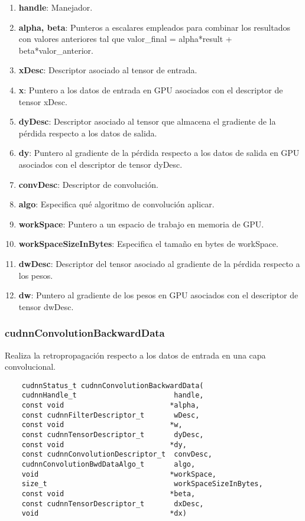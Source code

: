\begin{enumerate}
	\item \textbf{handle}: Manejador.
	\item \textbf{alpha, beta}: Punteros a escalares empleados para combinar los resultados con valores anteriores tal que valor\_final = alpha*result + beta*valor\_anterior.
	\item \textbf{xDesc}: Descriptor asociado al tensor de entrada.
	\item \textbf{x}: Puntero a los datos de entrada en GPU asociados con el descriptor de tensor xDesc.	
	\item \textbf{dyDesc}: Descriptor asociado al tensor que almacena el gradiente de la pérdida respecto a los datos de salida.
	\item \textbf{dy}: Puntero al gradiente de la pérdida respecto a los datos de salida en GPU asociados con el descriptor de tensor dyDesc.
	\item \textbf{convDesc}: Descriptor de convolución.
	\item \textbf{algo}: Especifica qué algoritmo de convolución aplicar.
	\item \textbf{workSpace}: Puntero a un espacio de trabajo en memoria de GPU.
	\item \textbf{workSpaceSizeInBytes}: Especifica el tamaño en bytes de workSpace.
	\item \textbf{dwDesc}: Descriptor del tensor asociado al gradiente de la pérdida respecto a los pesos.
	\item \textbf{dw}: Puntero al gradiente de los pesos en GPU asociados con el descriptor de tensor dwDesc.
\end{enumerate}
\cite{cuDNN_conv_back_w}


\subsubsection{cudnnConvolutionBackwardData} \label{cudnnConvolutionBackwardData}
Realiza la retropropagación respecto a los datos de entrada en una capa convolucional.

\begin{verbatim}
	cudnnStatus_t cudnnConvolutionBackwardData(
	cudnnHandle_t                       handle,
	const void                         *alpha,
	const cudnnFilterDescriptor_t       wDesc,
	const void                         *w,
	const cudnnTensorDescriptor_t       dyDesc,
	const void                         *dy,
	const cudnnConvolutionDescriptor_t  convDesc,
	cudnnConvolutionBwdDataAlgo_t       algo,
	void                               *workSpace,
	size_t                              workSpaceSizeInBytes,
	const void                         *beta,
	const cudnnTensorDescriptor_t       dxDesc,
	void                               *dx)
\end{verbatim}

